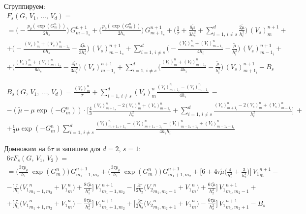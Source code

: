 Сгруппируем:
\begin{multline*}
F_s (G, \, V_1, \, \ldots, \, V_d) 
= \\ =
\bigg( - \frac{p_{\rho}(\exp (G^n_m))}{2 h_s} \bigg) \, G^{n+1}_{m - 1_s}
+
\bigg( \frac{p_{\rho}(\exp (G^n_m))}{2 h_s} \bigg) \, G^{n+1}_{m + 1_s}
+
\bigg( \frac{1}{\tau} + \frac{8 \widetilde{\mu}}{3 h_s^2} + \sum_{i = 1, \, i \not = s}^{d} \frac{2 \widetilde{\mu}}{h_i^2} \bigg) \, (V_s)^{n+1}_m
+ \\ +
\bigg( - \frac{(V_s)^n_m + (V_s)^n_{m - 1_s}}{6 h_s} - \frac{4 \widetilde{\mu}}{3 h_s^2} \bigg) \, (V_s)^{n+1}_{m - 1_s}
+
\sum_{i = 1, \, i \not = s}^{d} \bigg( - \frac{(V_i)^n_m + (V_i)^n_{m - 1_i}}{4 h_i} - \frac{\widetilde{\mu}}{h_i^2} \bigg) \, (V_s)^{n+1}_{m - 1_i}
+ \\ +
\bigg( \frac{(V_s)^n_m + (V_s)^n_{m + 1_s}}{6 h_s} - \frac{4 \widetilde{\mu}}{3 h_s^2} \bigg) \, (V_s)^{n+1}_{m + 1_s}
+
\sum_{i = 1, \, i \not = s}^{d} \bigg( \frac{(V_i)^n_m + (V_i)^n_{m + 1_i}}{4 h_i} - \frac{\widetilde{\mu}}{h_i^2} \bigg) \, (V_s)^{n+1}_{m + 1_i}
- B_s
\end{multline*}

\begin{multline*}
B_s (G, \, V_1, \, \ldots, \, V_d) =
\frac{(V_s)^n_m}{\tau} + \sum_{i = 1, \, i \not = s}^{d} (V_s)^n_m \frac{(V_i)^n_{m + 1_i} - (V_i)^n_{m - 1_i}}{4 h_i} 
\,- \\ -
(\widetilde{\mu} - \mu \exp(-G^n_m)) \cdot \bigg[ \frac{4}{3} \frac{(V_s)^n_{m + 1_s} - 2 (V_s)^n_m + (V_s)^n_{m - 1_s}}{h_s^2} + \sum_{i = 1, \, i \not = s}^{d} \frac{(V_s)^n_{m + 1_i} - 2 (V_s)^n_m + (V_s)^n_{m - 1_i}}{h_i^2} \bigg]
\, + \\ +
\frac{1}{3} \mu \exp(-G^n_m) \sum_{i = 1, \, i \not = s}^{d} \frac{(V_i)^n_{m + 1_s + 1_i} - (V_i)^n_{m + 1_s - 1_i} - (V_i)^n_{m - 1_s + 1_i} + (V_i)^n_{m - 1_s - 1_i}}{4 h_s h_i}
\end{multline*}

Домножим на $6\tau$ и запишем для $d=2$, $s=1$:
\begin{multline*}
6\tau F_s (G, \, V_1, \, V_2) 
= \\ =
\bigg( \frac{3 \tau p_{\rho}}{h_1} \; \exp (G^n_m) \bigg) \, G^{n+1}_{m_1 - 1, m_2}
+
\bigg( \frac{3 \tau p_{\rho}}{h_1} \; \exp (G^n_m) \bigg) \, G^{n+1}_{m_1 + 1, m_2}
+
\bigg[ 6 + 4 \tau \widetilde{\mu}  \bigg( \frac{4}{h_1^2} + \frac{3}{h_2^3} \bigg) \bigg] \, {V_1}^{n+1}_{m}
- \\ -
\bigg[ \frac{\tau}{h_1}     \bigg( {V_1}^{n}_{m_1 - 1, m_2} + {V_1}^{n}_{m} \bigg) + \frac{8 \tau \widetilde{\mu}}{h_1^2} \bigg] \, {V_1}^{n+1}_{m_1 - 1, m_2}
-
\bigg[ \frac{3 \tau}{2 h_2} \bigg( {V_2}^{n}_{m_1, m_2 - 1} + {V_1}^{n}_{m} \bigg) + \frac{6 \tau \widetilde{\mu}}{h_2^2} \bigg] \, {V_1}^{n+1}_{m_1, m_2 - 1}
+ \\ +
\bigg[ \frac{\tau}{h_1}     \bigg( {V_1}^{n}_{m_1 + 1, m_2} + {V_1}^{n}_{m} \bigg) - \frac{8 \tau \widetilde{\mu}}{h_1^2} \bigg] \, {V_1}^{n+1}_{m_1 + 1, m_2}
+
\bigg[ \frac{3 \tau}{2 h_2} \bigg( {V_2}^{n}_{m_1, m_2 + 1} + {V_1}^{n}_{m} \bigg) - \frac{6 \tau \widetilde{\mu}}{h_2^2} \bigg] \, {V_1}^{n+1}_{m_1, m_2 + 1}
- B_s
\end{multline*}


